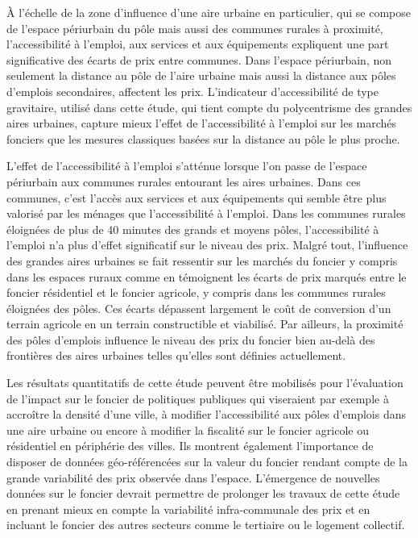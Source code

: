 \documentclass[10.5pt,a4paper]{article}
\begin{document}
{\`{A} l'échelle de la zone d'influence d'une aire urbaine en particulier, qui se compose de l’espace périurbain du pôle mais aussi des communes rurales à proximité, l'accessibilité à l'emploi, aux services et aux équipements expliquent une part significative des écarts de prix entre communes. Dans l'espace périurbain, non seulement la distance au pôle de l'aire urbaine mais aussi la distance aux pôles d'emplois secondaires, affectent les prix. L'indicateur d'accessibilité de type  gravitaire, utilisé dans cette étude, qui tient compte du polycentrisme des grandes aires urbaines, capture mieux l'effet de l'accessibilité à l'emploi sur les marchés fonciers que les mesures classiques basées sur la distance au pôle le plus proche.  \par 

L’effet de l'accessibilité à l'emploi s'atténue lorsque l’on passe de l’espace périurbain aux communes rurales entourant les aires urbaines. Dans ces communes, c'est l'accès aux services et aux équipements qui semble être plus valorisé par les ménages que l'accessibilité à l'emploi. Dans les communes rurales éloignées de plus de 40 minutes des grands et moyens pôles, l'accessibilité à l'emploi n'a plus d'effet significatif sur le niveau des prix. Malgré tout, l'influence des grandes aires urbaines se fait ressentir sur les marchés du foncier y compris dans les espaces ruraux comme en témoignent les écarts de prix marqués entre le foncier résidentiel et le foncier agricole, y compris dans les communes rurales éloignées des pôles. Ces écarts dépassent largement le coût de conversion d'un terrain agricole en un terrain constructible et viabilisé. Par ailleurs, la proximité des pôles d'emplois influence le niveau des prix du foncier bien au-delà des frontières des aires urbaines telles qu'elles sont définies actuellement. \par

Les résultats quantitatifs de cette étude peuvent être mobilisés pour l'évaluation de l'impact sur le foncier de politiques publiques qui viseraient par exemple à accroître la densité d'une ville, à modifier l'accessibilité aux pôles d'emplois dans une aire urbaine ou encore à modifier la fiscalité sur le foncier agricole ou résidentiel en périphérie des villes. Ils montrent également l'importance de disposer de données géo-référencées sur la valeur du foncier rendant compte de la grande variabilité des prix observée dans l'espace. L'émergence de nouvelles données sur le foncier devrait permettre de prolonger les travaux de cette étude en prenant mieux en compte la variabilité infra-communale des prix et en incluant le foncier des autres secteurs comme le tertiaire ou le logement collectif. 

}
\end{document}
